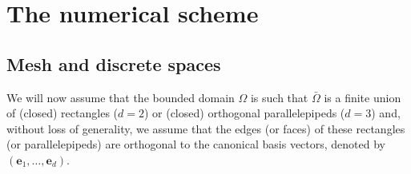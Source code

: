 \documentclass{amsart}
\numberwithin{equation}{section}
\begin{document}
\section{The numerical scheme}\label{3}

\subsection{Mesh and discrete spaces}

We will now assume that the bounded domain $\Omega$ is such that  $\bar \Omega$ is a finite union of (closed) rectangles ($d=2$) or (closed) orthogonal parallelepipeds ($d=3$) and, without loss of generality, we assume that the  edges (or faces) of these rectangles (or parallelepipeds) are orthogonal to the canonical basis vectors, denoted by $({{\boldsymbol e}}_1, \ldots, {{\boldsymbol e}}_d)$.
\end{document}
